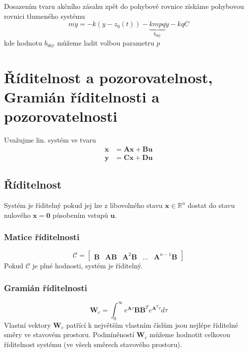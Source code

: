 \documentclass{article}
\begin{document}
	Dosazením tvaru akčního zásahu zpět do pohybové rovnice získáme pohybovou rovnici tlumeného systému
	\begin{equation}
		m\ddot{y} = -k (y-z_0(t)) - \underbrace{kmpq}_{b_{\text{sky}}}\dot{y} - kqC
	\end{equation}
	kde hodnotu $b_{\text{sky}}$ můžeme ladit volbou parametru $p$

	\section{Říditelnost a pozorovatelnost, Gramián říditelnosti a pozorovatelnosti}

	Uvažujme lin. systém ve tvaru
	\begin{align*}
		\bm{\dot{x}} &= \bm{A}\bm{x} + \bm{B}\bm{u} \\
		\bm{y} &= \bm{C}\bm{x} + \bm{D}\bm{u}
	\end{align*}

	\subsection*{Říditelnost}
	Systém je říditelný pokud jej lze z libovolného stavu $\bm{x} \in \mathbb{R}^n$ dostat do stavu nulového $\bm{x} = \bm{0}$ působením vstupů $\bm{u}$.

	\subsubsection*{Matice říditelnosti}
	\begin{equation}
		\bm{\mathcal{C}}
		=
		\begin{bmatrix}
			\bm{B} & \bm{A} \bm{B} & \bm{A}^{2} \bm{B} & \dots & \bm{A}^{n-1} \bm{B}
		\end{bmatrix}
	\end{equation}
	Pokud $\bm{\mathcal{C}}$ je plné hodnosti, systém je říditelný.

	\subsubsection*{Gramián říditelnosti}
	\begin{equation}
		\bm{W}_{c}
		=
		\int_{0}^{\infty} e^{\bm{A} \tau} \bm{B} \bm{B}^T e^{\bm{A}^T \tau} d \tau
	\end{equation}
	Vlastní vektory $\bm{W}_c$ patřící k největším vlastním číslům jsou nejlépe říditelné směry ve stavovém prostoru. Podmíněností $\bm{W}_c$ můžeme hodnotit celkovou říditelnost systému (ve všech směrech stavového prostoru).
\end{document}
